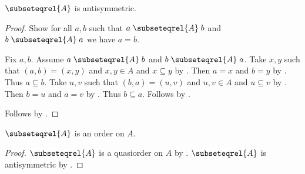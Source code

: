 \begin{proposition}\label{subseteqrel_antisymmetric}
    $\subseteqrel{A}$ is antisymmetric.
\end{proposition}
\begin{proof}
    Show for all $a,b$ such that
        $a\mathrel{\subseteqrel{A}}b$ and
        $b\mathrel{\subseteqrel{A}}a$
        we have $a=b$.
    \begin{subproof}
        Fix $a,b$.
        Assume $a\mathrel{\subseteqrel{A}}b$ and
            $b\mathrel{\subseteqrel{A}}a$.
        Take $x,y$ such that $(a,b)=(x,y)$ and
            $x,y\in A$ and $x\subseteq y$ by .
        Then $a=x$ and $b=y$ by .
        Thus $a\subseteq b$.
        Take $u,v$ such that $(b,a)=(u,v)$ and
            $u,v\in A$ and $u\subseteq v$ by .
        Then $b=u$ and $a=v$ by .
        Thus $b\subseteq a$.
        Follows by .
    \end{subproof}
    Follows by .
\end{proof}


\begin{proposition}\label{subseteqrel_is_order}
    $\subseteqrel{A}$ is an order on $A$.
\end{proposition}
\begin{proof}
    $\subseteqrel{A}$ is a quasiorder on $A$ by .
    $\subseteqrel{A}$ is antisymmetric by .
\end{proof}
